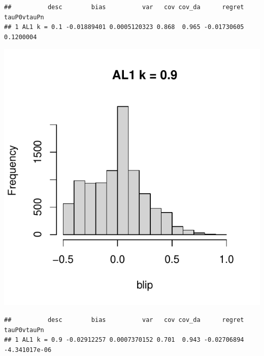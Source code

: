 \documentclass[11pt]{article}\usepackage[]{graphicx}\usepackage[table]{xcolor}
\makeatletter
\def\maxwidth{ %
  \ifdim\Gin@nat@width>\linewidth
    \linewidth
  \else
    \Gin@nat@width
  \fi
}
\newenvironment{kframe}{%
 \def\at@end@of@kframe{}%
 \ifinner\ifhmode%
  \def\at@end@of@kframe{\end{minipage}}%
  \begin{minipage}{\columnwidth}%
 \fi\fi%
 \def\FrameCommand##1{\hskip\@totalleftmargin \hskip-\fboxsep
 \colorbox{shadecolor}{##1}\hskip-\fboxsep
     \hskip-\linewidth \hskip-\@totalleftmargin \hskip\columnwidth}%
 \MakeFramed {\advance\hsize-\width
   \@totalleftmargin\z@ \linewidth\hsize
   \@setminipage}}%
 {\par\unskip\endMakeFramed%
 \at@end@of@kframe}
\newenvironment{knitrout}{}{} %
\makeatother
\begin{document}
\begin{knitrout}
\begin{kframe}\begin{verbatim}
##          desc        bias          var   cov cov_da      regret tauP0vtauPn
## 1 AL1 k = 0.1 -0.01889401 0.0005120323 0.868  0.965 -0.01730605   0.1200004
\end{verbatim}
\end{kframe}
\includegraphics[width=\maxwidth]{figure/unnamed-chunk-4-12} 
\begin{kframe}\begin{verbatim}
##          desc        bias          var   cov cov_da      regret   tauP0vtauPn
## 1 AL1 k = 0.9 -0.02912257 0.0007370152 0.701  0.943 -0.02706894 -4.341017e-06
\end{verbatim}
\end{kframe}
\end{knitrout}
\end{document}
